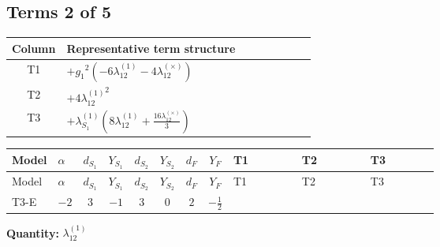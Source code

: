 \documentclass[8pt]{article}
\begin{document}
\begin{landscape}
\subsection*{Terms 2 of 5}
\begin{center}
\begin{tabular}{@{}c >{\raggedright\arraybackslash}p{0.82\linewidth}@{}}
\toprule
Column & Representative term structure \\
\midrule
T1 & \(\displaystyle +{g_1}^2 (-6 {\lambda_{12}^{(1)}}-4 {\lambda_{12}^{(\times)}})\) \\
\midrule
T2 & \(\displaystyle +4 {\lambda_{12}^{(1)}}^2\) \\
\midrule
T3 & \(\displaystyle +{\lambda_{S_1}^{(1)}} \left(8 {\lambda_{12}^{(1)}}+\frac{16 {\lambda_{12}^{(\times)}}}{3}\right)\) \\
\midrule
\bottomrule
\end{tabular}
\end{center}
\smallskip
\tiny
\begin{longtable}{@{}llcccccc >{\raggedright\arraybackslash}p{0.21\linewidth} >{\raggedright\arraybackslash}p{0.21\linewidth} >{\raggedright\arraybackslash}p{0.21\linewidth}@{}}
\toprule
Model & $\alpha$ & $d_{S_1}$ & $Y_{S_1}$ & $d_{S_2}$ & $Y_{S_2}$ & $d_F$ & $Y_F$ & T1 & T2 & T3 \\
\midrule
\endfirsthead
\toprule
Model & $\alpha$ & $d_{S_1}$ & $Y_{S_1}$ & $d_{S_2}$ & $Y_{S_2}$ & $d_F$ & $Y_F$ & T1 & T2 & T3 \\
\midrule
\endhead
T3-E & $-2$ & $3$ & $-1$ & $3$ & $0$ & $2$ & $-\frac{1}{2}$ & \scriptsize\adjustbox{max width=\linewidth}{$\begin{gathered} +{g_1}^2 (-6 {\lambda_{12}^{(1)}}-4 {\lambda_{12}^{(\times)}})\end{gathered}$} & \scriptsize\adjustbox{max width=\linewidth}{$\begin{gathered} +4 {\lambda_{12}^{(1)}}^2\end{gathered}$} & \scriptsize\adjustbox{max width=\linewidth}{$\begin{gathered} +{\lambda_{S_1}^{(1)}} \left(8 {\lambda_{12}^{(1)}}+\frac{16 {\lambda_{12}^{(\times)}}}{3}\right)\end{gathered}$} \\
\midrule
\bottomrule
\end{longtable}
\clearpage
\noindent\textbf{Quantity: }$\lambda_{12}^{(1)}$\par\smallskip

\end{landscape}
\end{document}
